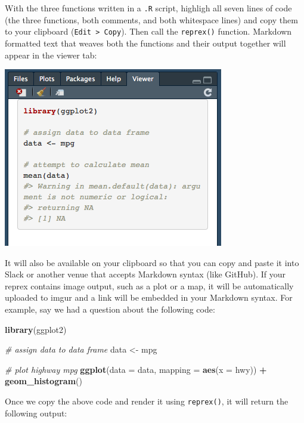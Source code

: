\documentclass[]{book}
\newenvironment{Shaded}{\begin{snugshade}}{\end{snugshade}}
\newcommand{\KeywordTok}[1]{\textcolor[rgb]{0.13,0.29,0.53}{\textbf{#1}}}
\newcommand{\DataTypeTok}[1]{\textcolor[rgb]{0.13,0.29,0.53}{#1}}
\newcommand{\StringTok}[1]{\textcolor[rgb]{0.31,0.60,0.02}{#1}}
\newcommand{\CommentTok}[1]{\textcolor[rgb]{0.56,0.35,0.01}{\textit{#1}}}
\newcommand{\OperatorTok}[1]{\textcolor[rgb]{0.81,0.36,0.00}{\textbf{#1}}}
\newcommand{\NormalTok}[1]{#1}
\theoremstyle{definition}
\theoremstyle{definition}
\theoremstyle{definition}
\theoremstyle{remark}
\begin{document}
With the three functions written in a \texttt{.R} script, highligh all
seven lines of code (the three functions, both comments, and both
whitespace lines) and copy them to your clipboard
(\texttt{Edit\ \textgreater{}\ Copy}). Then call the \texttt{reprex()}
function. Markdown formatted text that weaves both the functions and
their output together will appear in the viewer tab:

\begin{center}\includegraphics[width=0.5\linewidth]{images/reprex} \end{center}

It will also be available on your clipboard so that you can copy and
paste it into Slack or another venue that accepts Markdown syntax (like
GitHub). If your reprex contains image output, such as a plot or a map,
it will be automatically uploaded to imgur and a link will be embedded
in your Markdown syntax. For example, say we had a question about the
following code:

\begin{Shaded}
\begin{Highlighting}[]
\KeywordTok{library}\NormalTok{(ggplot2)}

\CommentTok{# assign data to data frame}
\NormalTok{data <-}\StringTok{ }\NormalTok{mpg}

\CommentTok{# plot highway mpg}
\KeywordTok{ggplot}\NormalTok{(}\DataTypeTok{data =}\NormalTok{ data, }\DataTypeTok{mapping =} \KeywordTok{aes}\NormalTok{(}\DataTypeTok{x =}\NormalTok{ hwy)) }\OperatorTok{+}\StringTok{ }
\StringTok{  }\KeywordTok{geom_histogram}\NormalTok{()}
\end{Highlighting}
\end{Shaded}

Once we copy the above code and render it using \texttt{reprex()}, it
will return the following output:
\end{document}
